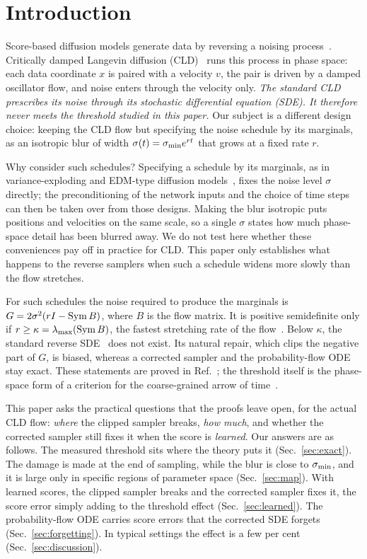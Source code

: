\section{Introduction}
\label{sec:intro}

Score-based diffusion models generate data by reversing a noising process~\cite{song2021sde,ho2020ddpm}.
Critically damped Langevin diffusion (CLD)~\cite{dockhorn2022cld} runs this process in phase space: each data coordinate $x$ is paired with a velocity $v$, the pair is driven by a damped oscillator flow, and noise enters through the velocity only.
\emph{The standard CLD prescribes its noise through its stochastic differential equation (SDE). It therefore never meets the threshold studied in this paper.}
Our subject is a different design choice: keeping the CLD flow but specifying the noise schedule by its marginals, as an isotropic blur of width $\sigma(t)=\sigma_{\min} e^{rt}$ that grows at a fixed rate $r$.

Why consider such schedules?
Specifying a schedule by its marginals, as in variance-exploding and EDM-type diffusion models~\cite{song2021sde,karras2022edm}, fixes the noise level $\sigma$ directly; the preconditioning of the network inputs and the choice of time steps can then be taken over from those designs.
Making the blur isotropic puts positions and velocities on the same scale, so a single $\sigma$ states how much phase-space detail has been blurred away.
We do not test here whether these conveniences pay off in practice for CLD.
This paper only establishes what happens to the reverse samplers when such a schedule widens more slowly than the flow stretches.

For such schedules the noise required to produce the marginals is $G=2\sigma^2(rI-\operatorname{Sym} B)$, where $B$ is the flow matrix.
It is positive semidefinite only if $r\geq\kappa=\lambda_{\max}(\operatorname{Sym} B)$, the fastest stretching rate of the flow~\cite{namba2026threshold}.
Below $\kappa$, the standard reverse SDE~\cite{anderson1982reverse,haussmann1986time} does not exist.
Its natural repair, which clips the negative part of $G$, is biased, whereas a corrected sampler and the probability-flow ODE~\cite{song2021sde} stay exact.
These statements are proved in Ref.~\cite{namba2026threshold}; the threshold itself is the phase-space form of a criterion for the coarse-grained arrow of time~\cite{namba2026arrow}.

This paper asks the practical questions that the proofs leave open, for the actual CLD flow:
\emph{where} the clipped sampler breaks, \emph{how much}, and whether the corrected sampler still fixes it when the score is \emph{learned}.
Our answers are as follows.
The measured threshold sits where the theory puts it (Sec.~\ref{sec:exact}).
The damage is made at the end of sampling, while the blur is close to $\sigma_{\min}$, and it is large only in specific regions of parameter space (Sec.~\ref{sec:map}).
With learned scores, the clipped sampler breaks and the corrected sampler fixes it, the score error simply adding to the threshold effect (Sec.~\ref{sec:learned}).
The probability-flow ODE carries score errors that the corrected SDE forgets (Sec.~\ref{sec:forgetting}).
In typical settings the effect is a few per cent (Sec.~\ref{sec:discussion}).

